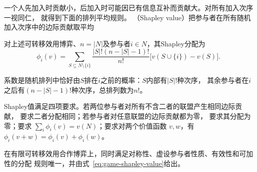 一个人先加入时贡献小，后加入时可能因已有信息互补而贡献大。对所有加入次序一视同仁，
就得到下面的排列平均规则。
（Shapley value）把参与者在所有随机加入次序中的边际贡献取平均
\begin{definition}[Shapley值]
\label{def:game-shapley-value}
对上述可转移效用博弈、\(n=|N|\)及参与者$i\in N$，其Shapley分配为
\begin{equation}
  \phi_i(v)
  =
  \sum_{S\subseteq N\setminus\{i\}}
  \frac{|S|!(n-|S|-1)!}{n!}
  \bigl[
    v(S\cup\{i\})-v(S)
  \bigr].
  \label{eq:game-shapley-value}
\end{equation}
\end{definition}
系数是随机排列中恰好由\(S\)排在\(i\)之前的概率：\(S\)内部有\(|S|!\)种次序，
其余参与者在\(i\)之后有\((n-|S|-1)!\)种次序，总排列数为\(n!\)。

Shapley值满足四项要求。若两位参与者对所有不含二者的联盟产生相同边际贡献，
要求二者分配相同；若参与者对任意联盟的边际贡献都为零，
要求其分配为零；要求
\(\sum_i\phi_i(v)=v(N)\)；要求对两个价值函数
\(v,w\)，有\(\phi_i(v+w)=\phi_i(v)+\phi_i(w)\)。

\begin{theorem}[Shapley值的公理刻画]
\label{thm:game-shapley-characterization}
在有限可转移效用合作博弈上，同时满足对称性、虚设参与者性质、有效性和可加性的分配
规则唯一，并由式~\eqref{eq:game-shapley-value}给出。
\end{theorem}

